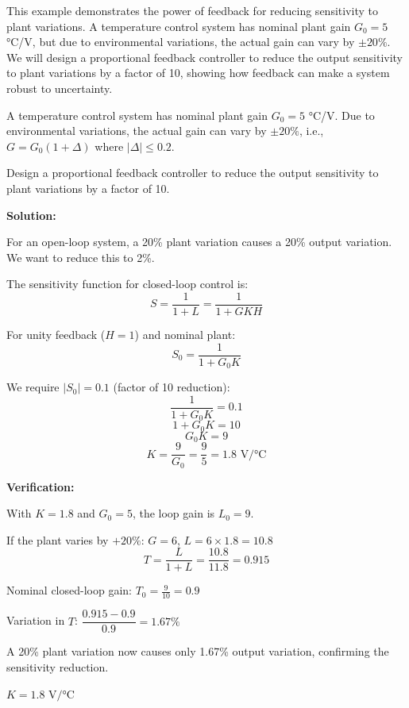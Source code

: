 \begin{examplebox}
This example demonstrates the power of feedback for reducing sensitivity to plant variations. A temperature control system has nominal plant gain $G_0 = 5$ °C/V, but due to environmental variations, the actual gain can vary by $\pm 20\%$. We will design a proportional feedback controller to reduce the output sensitivity to plant variations by a factor of 10, showing how feedback can make a system robust to uncertainty.
\end{examplebox}

\begin{example}
\label{ex:sensitivity}
A temperature control system has nominal plant gain $G_0 = 5$ °C/V. Due to environmental variations, the actual gain can vary by $\pm 20\%$, i.e., $G = G_0(1 + \Delta)$ where $|\Delta| \leq 0.2$.

Design a proportional feedback controller to reduce the output sensitivity to plant variations by a factor of 10.

\textbf{Solution:}

For an open-loop system, a 20\% plant variation causes a 20\% output variation. We want to reduce this to 2\%.

The sensitivity function for closed-loop control is:
\begin{equation*}
S = \frac{1}{1 + L} = \frac{1}{1 + GKH}
\end{equation*}

For unity feedback ($H = 1$) and nominal plant:
\begin{equation*}
S_0 = \frac{1}{1 + G_0 K}
\end{equation*}

We require $|S_0| = 0.1$ (factor of 10 reduction):
\begin{equation*}
\frac{1}{1 + G_0 K} = 0.1
\end{equation*}
\begin{equation*}
1 + G_0 K = 10
\end{equation*}
\begin{equation*}
G_0 K = 9
\end{equation*}
\begin{equation*}
K = \frac{9}{G_0} = \frac{9}{5} = 1.8 \text{ V/°C}
\end{equation*}

\textbf{Verification:}

With $K = 1.8$ and $G_0 = 5$, the loop gain is $L_0 = 9$.

If the plant varies by $+20\%$: $G = 6$, $L = 6 \times 1.8 = 10.8$
\begin{equation*}
T = \frac{L}{1+L} = \frac{10.8}{11.8} = 0.915
\end{equation*}

Nominal closed-loop gain: $T_0 = \frac{9}{10} = 0.9$

Variation in $T$: $\dfrac{0.915 - 0.9}{0.9} = 1.67\%$

A 20\% plant variation now causes only 1.67\% output variation, confirming the sensitivity reduction.

$\boxed{K = 1.8 \text{ V/°C}}$
\end{example}

